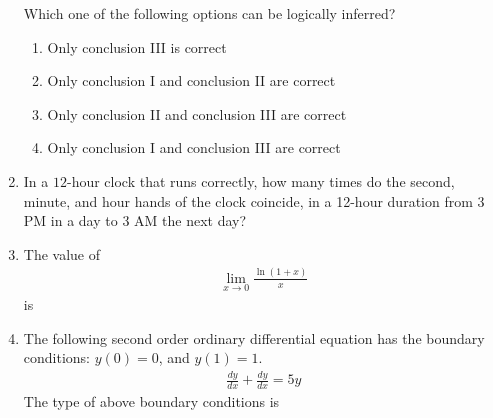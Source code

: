 \documentclass[journal,12pt,onecolumn]{IEEEtran}
\theoremstyle{remark}
\begin{document}
\begin{enumerate}
Which one of the following options can be logically inferred?

\hfill{}

\begin{enumerate}
\item Only conclusion III is correct
\item Only conclusion I and conclusion II are correct
\item Only conclusion II and conclusion III are correct
\item Only conclusion I and conclusion III are correct
\end{enumerate}

\item In a $12$-hour clock that runs correctly, how many times do the second, minute, and hour hands of the clock coincide, in a 12-hour duration from 3 PM in a day to 3 AM the next day?

\hfill{}

\begin{enumerate}
\end{enumerate}

\item The value of  
\begin{align*}
\lim_{x \to 0} \frac{\ln(1+x)}{x}
\end{align*}
is

\hfill{}

\begin{enumerate}
\end{enumerate}

\item The following second order ordinary differential equation has the boundary conditions: $y(0) = 0$, and $y(1) = 1$.  
\begin{align*}
\frac{d y}{d x} + \frac{d y}{d x} = 5 y
\end{align*}
The type of above boundary conditions is


\end{enumerate}
\end{document}
